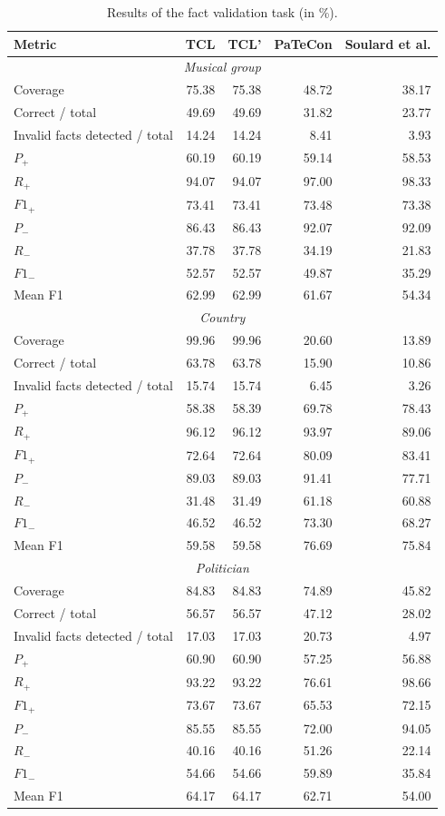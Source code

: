 \begin{table}[htbp]
\centering
\small
\begin{tabular}{l r r r r}
\hline
Metric & TCL & TCL' & PaTeCon & Soulard et al. \\
\hline\hline
\multicolumn{5}{c}{\textit{Musical group}} \\
\hline
Coverage & 75.38 & 75.38 & 48.72 & 38.17 \\
Correct / total & 49.69 & 49.69 & 31.82 & 23.77 \\
Invalid facts detected / total & 14.24 & 14.24 & 8.41 & 3.93 \\
\hline
$P_+$ & 60.19 & 60.19 & 59.14 & 58.53 \\
$R_+$ & 94.07 & 94.07 & 97.00 & 98.33 \\
$F1_+$ & 73.41 & 73.41 & 73.48 & 73.38 \\
\hline
$P_-$ & 86.43 & 86.43 & 92.07 & 92.09 \\
$R_-$ & 37.78 & 37.78 & 34.19 & 21.83 \\
$F1_-$ & 52.57 & 52.57 & 49.87 & 35.29 \\
\hline
Mean F1 & 62.99 & 62.99 & 61.67 & 54.34 \\
\hline
\hline
\multicolumn{5}{c}{\textit{Country}} \\
\hline
Coverage & 99.96 & 99.96 & 20.60 & 13.89 \\
Correct / total & 63.78 & 63.78 & 15.90 & 10.86 \\
Invalid facts detected / total & 15.74 & 15.74 & 6.45 & 3.26 \\
\hline
$P_+$ & 58.38 & 58.39 & 69.78 & 78.43 \\
$R_+$ & 96.12 & 96.12 & 93.97 & 89.06 \\
$F1_+$ & 72.64 & 72.64 & 80.09 & 83.41 \\
\hline
$P_-$ & 89.03 & 89.03 & 91.41 & 77.71 \\
$R_-$ & 31.48 & 31.49 & 61.18 & 60.88 \\
$F1_-$ & 46.52 & 46.52 & 73.30 & 68.27 \\
\hline
Mean F1 & 59.58 & 59.58 & 76.69 & 75.84 \\
\hline
\hline
\multicolumn{5}{c}{\textit{Politician}} \\
\hline
Coverage & 84.83 & 84.83 & 74.89 & 45.82 \\
Correct / total & 56.57 & 56.57 & 47.12 & 28.02 \\
Invalid facts detected / total & 17.03 & 17.03 & 20.73 & 4.97 \\
\hline
$P_+$ & 60.90 & 60.90 & 57.25 & 56.88 \\
$R_+$ & 93.22 & 93.22 & 76.61 & 98.66 \\
$F1_+$ & 73.67 & 73.67 & 65.53 & 72.15 \\
\hline
$P_-$ & 85.55 & 85.55 & 72.00 & 94.05 \\
$R_-$ & 40.16 & 40.16 & 51.26 & 22.14 \\
$F1_-$ & 54.66 & 54.66 & 59.89 & 35.84 \\
\hline
Mean F1 & 64.17 & 64.17 & 62.71 & 54.00 \\
\hline
\end{tabular}
\caption{Results of the fact validation task (in \%).}
\label{tab:fact-checking-politician}
\end{table}
